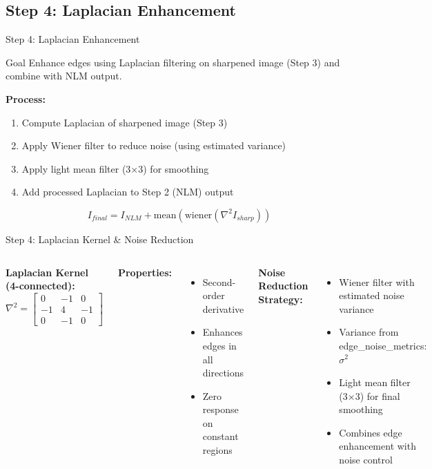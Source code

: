 \documentclass[aspectratio=169]{beamer}
\begin{document}
\subsection{Step 4: Laplacian Enhancement}

\begin{frame}{Step 4: Laplacian Enhancement}
    \begin{block}{Goal}
        Enhance edges using Laplacian filtering on sharpened image (Step 3) and combine with NLM output.
    \end{block}
    
    \textbf{Process:}
    \begin{enumerate}
        \item Compute Laplacian of sharpened image (Step 3)
        \item Apply Wiener filter to reduce noise (using estimated variance)
        \item Apply light mean filter (3×3) for smoothing
        \item Add processed Laplacian to Step 2 (NLM) output
    \end{enumerate}
    
    \begin{equation}
        I_{final} = I_{NLM} + \text{mean}(\text{wiener}(\nabla^2 I_{sharp}))
    \end{equation}
\end{frame}


\begin{frame}{Step 4: Laplacian Kernel \& Noise Reduction}
    \begin{columns}
        \textbf{Laplacian Kernel (4-connected):}
        \begin{equation}
            \nabla^2 = \begin{bmatrix} 0 & -1 & 0 \\ -1 & 4 & -1 \\ 0 & -1 & 0 \end{bmatrix}
        \end{equation}
        
        \textbf{Properties:}
        \begin{itemize}
            \item Second-order derivative
            \item Enhances edges in all directions
            \item Zero response on constant regions
        \end{itemize}
        
        \textbf{Noise Reduction Strategy:}
        \begin{itemize}
            \item Wiener filter with estimated noise variance
            \item Variance from edge\_noise\_metrics: $\sigma^2$
            \item Light mean filter (3×3) for final smoothing
            \item Combines edge enhancement with noise control
        \end{itemize}
    \end{columns}
\end{frame}
\end{document}

